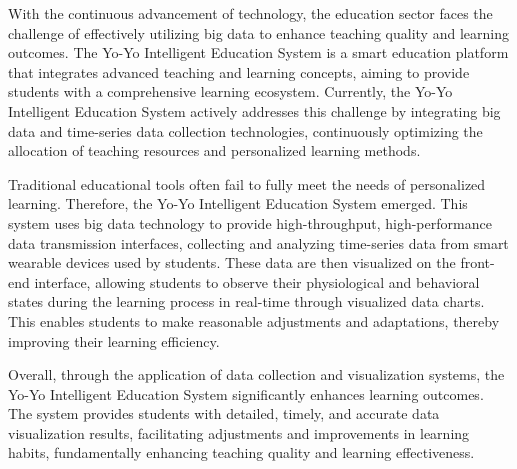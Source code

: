 With the continuous advancement of technology, the education sector faces the challenge of effectively utilizing big data to enhance teaching quality and learning outcomes. The Yo-Yo Intelligent Education System is a smart education platform that integrates advanced teaching and learning concepts, aiming to provide students with a comprehensive learning ecosystem. Currently, the Yo-Yo Intelligent Education System actively addresses this challenge by integrating big data and time-series data collection technologies, continuously optimizing the allocation of teaching resources and personalized learning methods.

Traditional educational tools often fail to fully meet the needs of personalized learning. Therefore, the Yo-Yo Intelligent Education System emerged. This system uses big data technology to provide high-throughput, high-performance data transmission interfaces, collecting and analyzing time-series data from smart wearable devices used by students. These data are then visualized on the front-end interface, allowing students to observe their physiological and behavioral states during the learning process in real-time through visualized data charts. This enables students to make reasonable adjustments and adaptations, thereby improving their learning efficiency.

Overall, through the application of data collection and visualization systems, the Yo-Yo Intelligent Education System significantly enhances learning outcomes. The system provides students with detailed, timely, and accurate data visualization results, facilitating adjustments and improvements in learning habits, fundamentally enhancing teaching quality and learning effectiveness.